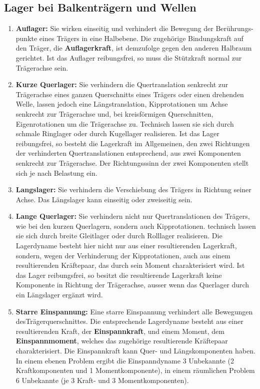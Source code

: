 \subsection{Lager bei Balkenträgern und Wellen}
\begin{enumerate}[$(a)$]
\item \textbf{Auflager:} Sie wirken einseitig und verhindert die Bewegung der Berührungs-punkte eines Trägers in eine Halbebene. Die zugehörige Bindungskraft auf den Träger, die \textbf{Auflagerkraft}, ist demzufolge gegen den anderen Halbraum gerichtet. Ist das Auflager reibungsfrei, so muss die Stützkraft normal zur Trägerachse sein.
\item \textbf{Kurze Querlager:} Sie verhindern die Quertranslation senkrecht zur Trägerachse eines ganzen Querschnitts eines Trägers oder einen drehenden Welle, lassen jedoch eine Längstranslation, Kipprotationen um Achse senkrecht zur Trägerachse und, bei kreisförmigen Querschnitten, Eigenrotationen um die Trägerachse zu. Technisch lassen sie sich durch schmale Ringlager oder durch Kugellager realisieren. Ist das Lager reibungsfrei, so besteht die Lagerkraft im Allgemeinen, den zwei Richtungen der verhinderten Quertranslationen entsprechend, aus zwei Komponenten senkrecht zur Trägerachse. Der Richtungsssinn der zwei Komponenten stellt sich je nach Belastung ein.  
\item \textbf{Langslager:} Sie verhindern die Verschiebung des Trägers in Richtung seiner Achse. Das Längslager kann einseitig oder zweiseitig sein.
\item \textbf{Lange Querlager:} Sie verhindern nicht nur Quertranslationen des Trägers, wie bei den kurzen Querlagern, sondern auch Kipprotationen. technisch lassen sie sich durch breite Gleitlager oder durch Rolllager realisieren. Die Lagerdyname besteht hier nicht nur aus einer resultierenden Lagerkraft, sondern, wegen der Verhinderung der Kipprotationen, auch aus einem resultierenden Kräftepaar, das durch sein Moment charakterisiert wird. Ist das Lager reibungsfrei, so besitzt die resultierende Lagerkraft keine Komponente in Richtung der Trägerachse, ausser wenn das Querlager durch ein Längslager ergänzt wird.
\item \textbf{Starre Einspannung:} Eine starre Einspannung verhindert alle Bewegungen desTrägerquerschnittes. Die entsprechende Lagerdyname besteht aus einer resultierenden Kraft, der \textbf{Einspannkraft}, und einem Moment, dem \textbf{Einspannmoment}, welches das zugehörige resultierende Kräftepaar charakterisiert. Die Einspannkraft kann Quer- und Längskomponenten haben. In einem ebenen Problem ergibt die Einspanndyname 3 Unbekannte (2 Kraftkomponenten und 1 Momentkomponente), in einem räumlichen Problem 6 Unbekannte (je 3 Kraft- und 3 Momentkomponenten).

\end{enumerate}
